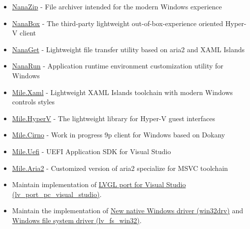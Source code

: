 \documentclass{resume}
\begin{document}
\begin{itemize}
  \item \href{https://github.com/M2Team/NanaZip}{NanaZip} - File archiver intended for the modern Windows experience
  \item \href{https://github.com/M2Team/NanaBox}{NanaBox} - The third-party lightweight out-of-box-experience oriented Hyper-V client
  \item \href{https://github.com/M2Team/NanaGet}{NanaGet} - Lightweight file transfer utility based on aria2 and XAML Islands
  \item \href{https://github.com/M2Team/NanaRun}{NanaRun} - Application runtime environment customization utility for Windows
\end{itemize} 

\begin{itemize}
  \item \href{https://github.com/ProjectMile/Mile.Xaml}{Mile.Xaml} - Lightweight XAML Islands toolchain with modern Windows controls styles
  \item \href{https://github.com/ProjectMile/Mile.HyperV}{Mile.HyperV} - The lightweight library for Hyper-V guest interfaces
  \item \href{https://github.com/ProjectMile/Mile.Cirno}{Mile.Cirno} - Work in progress 9p client for Windows based on Dokany
  \item \href{https://github.com/ProjectMile/Mile.Uefi}{Mile.Uefi} - UEFI Application SDK for Visual Studio
  \item \href{https://github.com/ProjectMile/Mile.Aria2}{Mile.Aria2} - Customized version of aria2 specialize for MSVC toolchain
\end{itemize} 

\begin{itemize}
  \item Maintain implementation of \href{https://github.com/lvgl/lv_port_pc_visual_studio}{LVGL port for Visual Studio (lv\_port\_pc\_visual\_studio)}.
  \item Maintain the implementation of \href{https://github.com/lvgl/lv_drivers/pull/117}{New native Windows driver (win32drv)} and \href{https://github.com/lvgl/lvgl/pull/2701}{Windows file system driver (lv\_fs\_win32)}.
\end{itemize}
\end{document}
